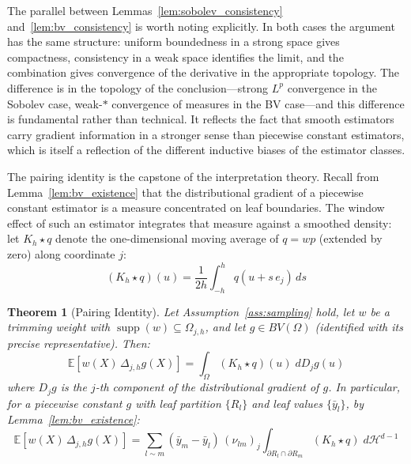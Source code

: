 \documentclass[12pt]{article}
\newtheorem{theorem}{Theorem}
\newcommand{\E}{\mathbb{E}}
\newcommand{\BV}{BV(\Omega)}
\newcommand{\Dh}{\Delta_{j,h}}
\begin{document}
	The parallel between Lemmas~\ref{lem:sobolev_consistency}
	and~\ref{lem:bv_consistency} is worth noting explicitly. In both cases the argument
	has the same structure: uniform boundedness in a strong space gives compactness,
	consistency in a weak space identifies the limit, and the combination gives
	convergence of the derivative in the appropriate topology. The difference is in the
	topology of the conclusion---strong $L^p$ convergence in the Sobolev case, weak-$*$
	convergence of measures in the BV case---and this difference is fundamental rather
	than technical. It reflects the fact that smooth estimators carry gradient
	information in a stronger sense than piecewise constant estimators, which is itself a
	reflection of the different inductive biases of the estimator classes.
	
	The pairing identity is the capstone of the interpretation theory. Recall from
	Lemma~\ref{lem:bv_existence} that the distributional gradient of a piecewise
	constant estimator is a measure concentrated on leaf boundaries. The window effect
	of such an estimator integrates that measure against a smoothed density: let
	$K_h \star q$ denote the one-dimensional moving average of $q = wp$ (extended by
	zero) along coordinate $j$:
	\begin{equation}
		(K_h \star q)(u) = \frac{1}{2h} \int_{-h}^{h} q(u + s\, e_j)\, ds
	\end{equation}
	
	\begin{theorem}[Pairing Identity]
		\label{thm:pairing}
		Let Assumption~\ref{ass:sampling} hold, let $w$ be a trimming weight with
		$\operatorname{supp}(w) \subseteq \Omega_{j,h}$, and let $g \in \BV$
		(identified with its precise representative). Then:
		\begin{equation}
			\E\left[w(X)\, \Dh g(X)\right]
			= \int_\Omega (K_h \star q)(u)\; dD_j g(u)
			\label{eq:pairing}
		\end{equation}
		where $D_j g$ is the $j$-th component of the distributional gradient of $g$.
		In particular, for a piecewise constant $g$ with leaf partition $\{R_l\}$ and
		leaf values $\{\bar{y}_l\}$, by Lemma~\ref{lem:bv_existence}:
		\begin{equation}
			\E\left[w(X)\, \Dh g(X)\right]
			= \sum_{l \sim m} (\bar{y}_m - \bar{y}_l)\, (\nu_{lm})_j
			\int_{\partial R_l \cap \partial R_m} (K_h \star q)\;
			d\mathcal{H}^{d-1}
			\label{eq:pairing_tree}
		\end{equation}
	\end{theorem}
	
\end{document}
